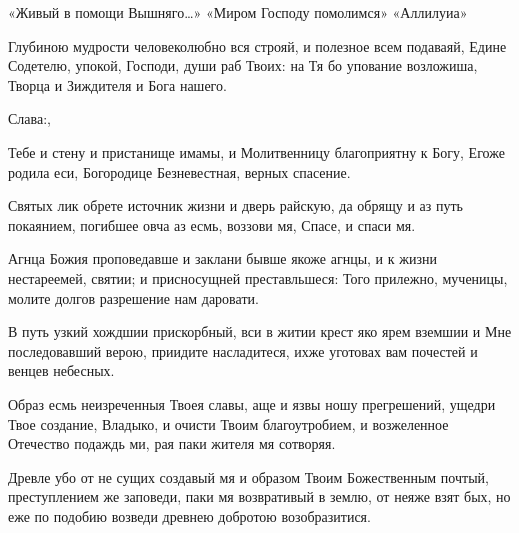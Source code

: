 \mychapterending

\begin{mymulticols}


 «Живый в помощи Вышняго…»  «Миром Господу помолимся»  «Аллилуиа» 


Глубиною мудрости человеколюбно вся строяй, и полезное всем подаваяй, Едине Содетелю, упокой, Господи, души раб Твоих: на Тя бо упование возложиша, Творца и Зиждителя и Бога нашего. 

Слава:, \inynen

Тебе и стену и пристанище имамы, и Молитвенницу благоприятну к Богу, Егоже родила еси, Богородице Безневестная, верных спасение.



Святых лик обрете источник жизни и дверь райскую, да обрящу и аз путь покаянием, погибшее овча аз есмь, воззови мя, Спасе, и спаси мя. 


Агнца Божия проповедавше и заклани бывше якоже агнцы, и к жизни нестареемей, святии; и присносущней преставльшеся: Того прилежно, мученицы, молите долгов разрешение нам даровати. 


В путь узкий хождшии прискорбный, вси в житии крест яко ярем вземшии и Мне последовавший верою, приидите насладитеся, ихже уготовах вам почестей и венцев небесных. 


Образ есмь неизреченныя Твоея славы, аще и язвы ношу прегрешений, ущедри Твое создание, Владыко, и очисти Твоим благоутробием, и возжеленное Отечество подаждь ми, рая паки жителя мя сотворяя. 


Древле убо от не сущих создавый мя и образом Твоим Божественным почтый, преступлением же заповеди, паки мя возвративый в землю, от неяже взят бых, но еже по подобию возведи древнею добротою возобразитися. 


\end{mymulticols}
